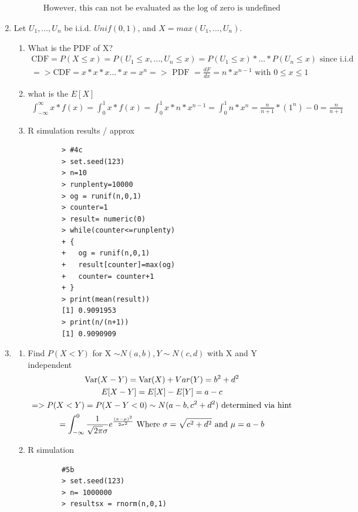 \documentclass[11pt]{article}
\newcommand{\Var}{\mathop{\rm Var}}
\begin{document}
\begin{enumerate}
\begin{enumerate}
\begin{gather}
	\text{However, this can not be evaluated as the log of zero is undefined}
	\end{gather}
\end{enumerate}
\item Let $U_1,...,U_n$ be i.i.d. $Unif(0,1)$, and $X = max(U_1,...,U_n)$.
\begin{enumerate}
	\item What is the PDF of X?
	\begin{gather}
		\text{CDF} = P(X \le x) = P(U_1 \le x , ... , U_n \le x) = P(U_1 \le x) *  ... * P(U_n \le x) \text{ since i.i.d}\\
		=> \text{CDF} = x*x*x...*x = x^n => \text{ PDF } = \frac{dF}{dx} = n*x^{n-1} \text{ with } 0 \le x \le 1
	\end{gather}
	\item what is the $E[X]$
	\begin{gather}
		\int_{-\infty}^{\infty}x*f(x) = \int_{0}^{1}x*f(x) = \int_{0}^{1}x*n*x^{n-1} = \int_{0}^{1}n*x^{n} =\frac{n}{n+1}*(1^n) - 0 = \frac{n}{n+1}
	\end{gather}
	\item R simulation results / approx
	\begin{verbatim}
		> #4c
		> set.seed(123)
		> n=10
		> runplenty=10000
		> og = runif(n,0,1)
		> counter=1
		> result= numeric(0)
		> while(counter<=runplenty)
		+ {
		+   og = runif(n,0,1)
		+   result[counter]=max(og)
		+   counter= counter+1
		+ }
		> print(mean(result))
		[1] 0.9091953
		> print(n/(n+1))
		[1] 0.9090909
	\end{verbatim}
\end{enumerate}
\item 
\begin{enumerate}
	\item Find $P(X < Y)$ for X $\sim N(a, b), Y \sim N(c, d)$ with X and Y independent
	\begin{gather}
	\Var(X-Y) = \Var(X) + Var(Y) = b^2 + d^2\\
	E[X-Y] = E[X] - E[Y] = a - c\\
	=>	P(X<Y) = P(X-Y < 0) \sim N(a-b,c^2 + d^2) \text{ determined via hint}\\
		= \int_{-\infty}^{0} \frac{1}{\sqrt{2\pi} \sigma} e ^ {\frac{(x-\mu)^2}{2\sigma ^2}} \text{ Where } \sigma = \sqrt{c^2 + d^2} \text{ and } \mu = a-b
	\end{gather}
	\item R simulation
	\begin{verbatim}
		#5b
		> set.seed(123)
		> n= 1000000
		> resultsx = rnorm(n,0,1)

\end{verbatim}
\end{enumerate}
\end{enumerate}
\end{document}
